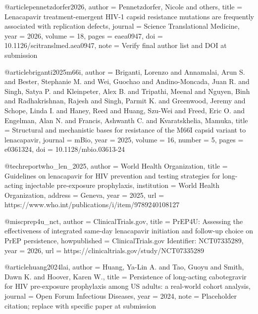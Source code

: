 @article{pennetzdorfer2026,
  author  = {Pennetzdorfer, Nicole and others},
  title   = {Lenacapavir treatment-emergent {HIV-1} capsid resistance mutations are frequently associated with replication defects},
  journal = {Science Translational Medicine},
  year    = {2026},
  volume  = {18},
  pages   = {eaea0947},
  doi     = {10.1126/scitranslmed.aea0947},
  note    = {Verify final author list and DOI at submission}
}

@article{briganti2025m66i,
  author  = {Briganti, Lorenzo and Annamalai, Arun S. and Bester, Stephanie M. and Wei, Guochao and Andino-Moncada, Juan R. and Singh, Satya P. and Kleinpeter, Alex B. and Tripathi, Meenal and Nguyen, Binh and Radhakrishnan, Rajesh and Singh, Parmit K. and Greenwood, Jeremy and Schope, Linda I. and Haney, Reed and Huang, Szu-Wei and Freed, Eric O. and Engelman, Alan N. and Francis, Ashwanth C. and Kvaratskhelia, Mamuka},
  title   = {Structural and mechanistic bases for resistance of the {M66I} capsid variant to lenacapavir},
  journal = {mBio},
  year    = {2025},
  volume  = {16},
  number  = {5},
  pages   = {e0361324},
  doi     = {10.1128/mbio.03613-24}
}

@techreport{who_len_2025,
  author      = {{World Health Organization}},
  title       = {Guidelines on lenacapavir for {HIV} prevention and testing strategies for long-acting injectable pre-exposure prophylaxis},
  institution = {World Health Organization},
  address     = {Geneva},
  year        = {2025},
  url         = {https://www.who.int/publications/i/item/9789240108127}
}

@misc{prep4u_nct,
  author       = {{ClinicalTrials.gov}},
  title        = {{PrEP4U}: Assessing the effectiveness of integrated same-day lenacapavir initiation and follow-up choice on {PrEP} persistence},
  howpublished = {{ClinicalTrials.gov} Identifier: NCT07335289},
  year         = {2026},
  url          = {https://clinicaltrials.gov/study/NCT07335289}
}


@article{huang2024lai,
  author  = {Huang, Ya-Lin A. and Tao, Guoyu and Smith, Dawn K. and Hoover, Karen W.},
  title   = {Persistence of long-acting cabotegravir for {HIV} pre-exposure prophylaxis among {US} adults: a real-world cohort analysis},
  journal = {Open Forum Infectious Diseases},
  year    = {2024},
  note    = {Placeholder citation; replace with specific paper at submission}
}

